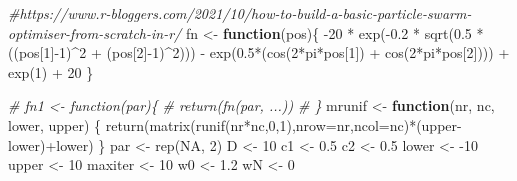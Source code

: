 \documentclass[
  oneside]{book}
\newenvironment{Shaded}{\begin{snugshade}}{\end{snugshade}}
\newcommand{\AttributeTok}[1]{\textcolor[rgb]{0.77,0.63,0.00}{#1}}
\newcommand{\CommentTok}[1]{\textcolor[rgb]{0.56,0.35,0.01}{\textit{#1}}}
\newcommand{\ConstantTok}[1]{\textcolor[rgb]{0.00,0.00,0.00}{#1}}
\newcommand{\ControlFlowTok}[1]{\textcolor[rgb]{0.13,0.29,0.53}{\textbf{#1}}}
\newcommand{\DecValTok}[1]{\textcolor[rgb]{0.00,0.00,0.81}{#1}}
\newcommand{\FloatTok}[1]{\textcolor[rgb]{0.00,0.00,0.81}{#1}}
\newcommand{\FunctionTok}[1]{\textcolor[rgb]{0.00,0.00,0.00}{#1}}
\newcommand{\NormalTok}[1]{#1}
\newcommand{\OtherTok}[1]{\textcolor[rgb]{0.56,0.35,0.01}{#1}}
\newcommand{\SpecialCharTok}[1]{\textcolor[rgb]{0.00,0.00,0.00}{#1}}
\begin{document}
\begin{Shaded}
\begin{Highlighting}[]
\CommentTok{\#https://www.r{-}bloggers.com/2021/10/how{-}to{-}build{-}a{-}basic{-}particle{-}swarm{-}optimiser{-}from{-}scratch{-}in{-}r/}
\NormalTok{fn }\OtherTok{\textless{}{-}} \ControlFlowTok{function}\NormalTok{(pos)\{}
  \SpecialCharTok{{-}}\DecValTok{20} \SpecialCharTok{*} \FunctionTok{exp}\NormalTok{(}\SpecialCharTok{{-}}\FloatTok{0.2} \SpecialCharTok{*} \FunctionTok{sqrt}\NormalTok{(}\FloatTok{0.5} \SpecialCharTok{*}\NormalTok{((pos[}\DecValTok{1}\NormalTok{]}\SpecialCharTok{{-}}\DecValTok{1}\NormalTok{)}\SpecialCharTok{\^{}}\DecValTok{2} \SpecialCharTok{+}\NormalTok{ (pos[}\DecValTok{2}\NormalTok{]}\SpecialCharTok{{-}}\DecValTok{1}\NormalTok{)}\SpecialCharTok{\^{}}\DecValTok{2}\NormalTok{))) }\SpecialCharTok{{-}} \FunctionTok{exp}\NormalTok{(}\FloatTok{0.5}\SpecialCharTok{*}\NormalTok{(}\FunctionTok{cos}\NormalTok{(}\DecValTok{2}\SpecialCharTok{*}\NormalTok{pi}\SpecialCharTok{*}\NormalTok{pos[}\DecValTok{1}\NormalTok{]) }\SpecialCharTok{+} \FunctionTok{cos}\NormalTok{(}\DecValTok{2}\SpecialCharTok{*}\NormalTok{pi}\SpecialCharTok{*}\NormalTok{pos[}\DecValTok{2}\NormalTok{]))) }\SpecialCharTok{+} \FunctionTok{exp}\NormalTok{(}\DecValTok{1}\NormalTok{) }\SpecialCharTok{+} \DecValTok{20}
\NormalTok{\}}

\CommentTok{\# fn1 \textless{}{-} function(par)\{}
\CommentTok{\#   return(fn(par, ...))}
\CommentTok{\# \}}
\NormalTok{mrunif }\OtherTok{\textless{}{-}} \ControlFlowTok{function}\NormalTok{(nr, nc, lower, upper) \{}
    \FunctionTok{return}\NormalTok{(}\FunctionTok{matrix}\NormalTok{(}\FunctionTok{runif}\NormalTok{(nr}\SpecialCharTok{*}\NormalTok{nc,}\DecValTok{0}\NormalTok{,}\DecValTok{1}\NormalTok{),}\AttributeTok{nrow=}\NormalTok{nr,}\AttributeTok{ncol=}\NormalTok{nc)}\SpecialCharTok{*}\NormalTok{(upper}\SpecialCharTok{{-}}\NormalTok{lower)}\SpecialCharTok{+}\NormalTok{lower)}
\NormalTok{\}}
\NormalTok{par }\OtherTok{\textless{}{-}} \FunctionTok{rep}\NormalTok{(}\ConstantTok{NA}\NormalTok{, }\DecValTok{2}\NormalTok{)}
\NormalTok{D }\OtherTok{\textless{}{-}} \DecValTok{10}
\NormalTok{c1 }\OtherTok{\textless{}{-}} \FloatTok{0.5}
\NormalTok{c2 }\OtherTok{\textless{}{-}} \FloatTok{0.5}
\NormalTok{lower }\OtherTok{\textless{}{-}} \SpecialCharTok{{-}}\DecValTok{10}
\NormalTok{upper }\OtherTok{\textless{}{-}} \DecValTok{10}
\NormalTok{maxiter }\OtherTok{\textless{}{-}} \DecValTok{10}
\NormalTok{w0 }\OtherTok{\textless{}{-}} \FloatTok{1.2}
\NormalTok{wN }\OtherTok{\textless{}{-}} \DecValTok{0}


\end{Highlighting}
\end{Shaded}
\end{document}
